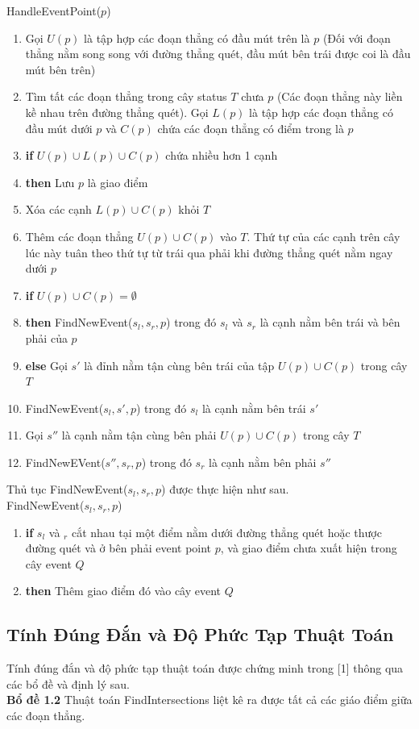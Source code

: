 \documentclass[15pt]{article}
\begin{document}
{HandleEventPoint($p$)
\begin{enumerate}
\item Gọi $U(p)$ là tập hợp các đoạn thẳng có đầu mút trên là $p$ (Đối với đoạn thẳng nằm song song với đường thẳng quét, đầu mút bên trái được coi là đầu mút bên trên)
\item Tìm tất các đoạn thẳng trong cây status $T$ chưa $p$ (Các đoạn thẳng này liền kề nhau trên đường thẳng quét). Gọi $L(p)$ là tập hợp các đoạn thẳng có đầu mút dưới $p$ và $C(p)$ chứa các đoạn thẳng có điểm trong là $p$
\item \textbf{if} $U(p) \cup L(p) \cup C(p)$ chứa nhiều hơn 1 cạnh
\item \quad \textbf{then} Lưu $p$ là giao điểm
\item Xóa các cạnh $L(p) \cup C(p)$ khỏi $T$
\item Thêm các đoạn thẳng $U(p) \cup C(p)$ vào $T$. Thứ tự của các cạnh trên cây lúc này tuân theo thứ tự từ trái qua phải khi đường thẳng quét nằm ngay dưới $p$
\item \textbf{if} $U(p) \cup C(p) = \emptyset$
\item \quad \textbf{then} FindNewEvent($s_l, s_r, p$) trong đó $s_l$ và $s_r$ là cạnh nằm bên trái và bên phải của $p$
\item \textbf{else} Gọi $s'$ là đỉnh nằm tận cùng bên trái của tập $U(p) \cup C(p)$ trong cây $T$
\item \quad FindNewEvent($s_l, s', p$) trong đó $s_l$ là cạnh nằm bên trái $s'$
\item \quad Gọi $s''$ là cạnh nằm tận cùng bên phải $U(p) \cup C(p)$ trong cây $T$
\item \quad FindNewEVent($s'', s_r, p$) trong đó $s_r$ là cạnh nằm bên phải $s''$
\end{enumerate}
Thủ tục FindNewEvent($s_l, s_r, p$) được thực hiện như sau. \\
FindNewEvent($s_l, s_r, p$)
\begin{enumerate}
\item \textbf{if} $s_l$ và $_r$ cắt nhau tại một điểm nằm dưới đường thẳng quét hoặc thược đường quét và ở bên phải event point $p$, và giao điểm chưa xuất hiện trong cây event $Q$
\item \quad \textbf{then} Thêm giao điểm đó vào cây event $Q$
\end{enumerate}

\subsection{Tính Đúng Đắn và Độ Phức Tạp Thuật Toán}
Tính đúng đắn và độ phức tạp thuật toán được chứng minh trong [1] thông qua các bổ đề và định lý sau.\\
\textbf{Bổ đề 1.2} Thuật toán FindIntersections liệt kê ra được tất cả các giáo điểm giữa các đoạn thẳng. \\

}
\end{document}
